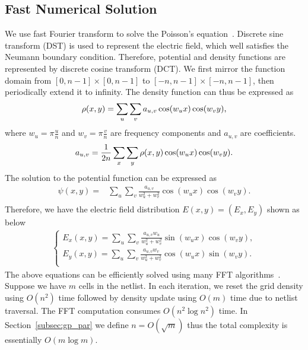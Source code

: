 \documentclass[conference,10pt]{IEEEtran}
\newcounter{def}
\begin{document}
\subsection{Fast Numerical Solution}

We use fast Fourier transform 
to solve the Poisson's equation~\cite{fft_poi}.
Discrete sine transform (DST) is used  
to represent the electric field, 
which well satisfies the Neumann boundary condition. 
Therefore, potential and density functions are 
represented by discrete cosine transform (DCT).
We first mirror the function domain
from $[0,n-1]\times [0,n-1]$ to 
$[-n,n-1]\times [-n,n-1]$, 
then periodically extend it to infinity.
The density function can thus be expressed as 
\begin{equation}
\label{eq:cos}
\rho(x,y) = \sum_{u}\sum_{v} a_{u,v}\cos(w_ux)\cos(w_vy)\text{,} \\
\end{equation}
where $w_u=\pi\frac{u}{n}$ and 
$w_v=\pi\frac{v}{n}$ are frequency components 
and $a_{u,v}$ are coefficients. 
\begin{equation}
\label{eq:coef}
a_{u,v} = \frac{1}{2n}\sum_{x}\sum_{y} \rho(x,y)\cos(w_ux)\cos(w_vy)\text{.} \\
\end{equation}
The solution to the potential function can be expressed as 
\begin{equation}
\label{eq:psi}
\begin{aligned}
\psi(x,y) = & \sum_{u}\sum_{v}\frac{a_{u,v}}{w_u^2+w_v^2}\cos(w_ux)\cos(w_vy).  \\
\end{aligned}
\end{equation}
Therefore, we have the electric field distribution 
$E(x,y)=(E_x,E_y)$ shown as below
\begin{equation}
\label{eq:dct}
\begin{aligned}
\begin{cases}
E_x (x,y) = \sum_{u}\sum_{v}\frac{a_{u,v}w_u}{w_u^2+w_v^2}\sin(w_ux)\cos(w_vy), \\
E_y (x,y) = \sum_{u}\sum_{v}\frac{a_{u,v}w_v}{w_u^2+w_v^2}\cos(w_ux)\sin(w_vy). \\
\end{cases}
\end{aligned}
\end{equation}
The above equations can be efficiently solved 
using many FFT algorithms~\cite{fft}.
Suppose we have $m$ cells in the netlist.
In each iteration,
we reset the grid density using $O(n^2)$ time 
followed by density update using $O(m)$ time due to netlist traversal.
The FFT computation consumes $O(n^2\log n^2)$ time. 
In Section~\ref{subsec:gp_par} we define $n=O(\sqrt{m})$ thus the 
total complexity is essentially $O(m\log m)$.
\end{document}
